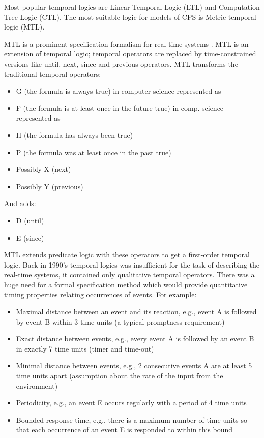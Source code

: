 Most popular temporal logics are Linear Temporal Logic (LTL) and Computation Tree Logic (CTL). The most suitable logic for models of CPS is Metric temporal logic (MTL).

MTL is a prominent specification formalism for real-time systems \cite{Ouaknine:MTLdecidability}. MTL is an extension of temporal logic; temporal operators are replaced by time-constrained versions like until, next, since and previous operators. MTL transforms the traditional temporal operators:

\begin{itemize}
    \item G (the formula is always true) in computer science represented as
    \item F (the formula is at least once in the future true) in comp. science represented as
    \item H (the formula has always been true)
    \item P (the formula was at least once in the past true)
    \item Possibly X (next)
    \item Possibly Y (previous)
\end{itemize}

And adds:

\begin{itemize}
    \item D (until)
    \item E (since)
\end{itemize}

MTL extends predicate logic with these operators to get a first-order temporal logic. Back in 1990’s temporal logics was insufficient for the task of describing the real-time systems, it contained only qualitative temporal operators. There was a huge need for a formal specification method which would provide quantitative timing properties relating occurrences of events. For example:

\begin{itemize}
    \item Maximal distance between an event and its reaction, e.g., event A is followed by event B within 3 time units (a typical promptness requirement)
    \item Exact distance between events, e.g., every event A is followed by an event B in exactly 7 time units (timer and time-out)
    \item Minimal distance between events, e.g., 2 consecutive events A are at least 5 time units apart (assumption about the rate of the input from the environment)
    \item Periodicity, e.g., an event E occurs regularly with a period of 4 time units
    \item Bounded response time, e.g., there is a maximum number of time units so that each occurrence of an event E is responded to within this bound
\end{itemize}


